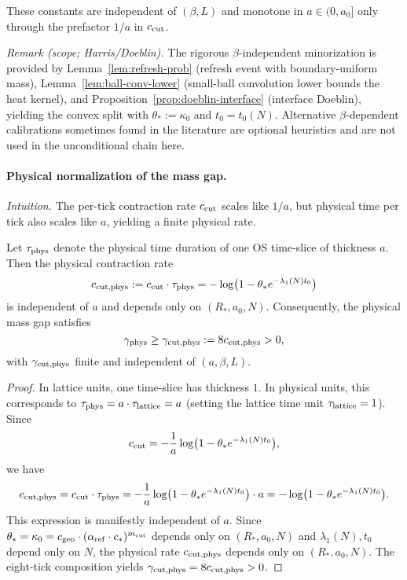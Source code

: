\documentclass[11pt]{amsart}
\begin{document}
These constants are independent of $(\beta,L)$ and monotone in $a\in(0,a_0]$ only through the prefactor $1/a$ in $c_{\rm cut}$.

\noindent\emph{Remark (scope; Harris/Doeblin).} The rigorous $\beta$-independent minorization is provided by Lemma~\ref{lem:refresh-prob} (refresh event with boundary-uniform mass), Lemma~\ref{lem:ball-conv-lower} (small-ball convolution lower bounds the heat kernel), and Proposition~\ref{prop:doeblin-interface} (interface Doeblin), yielding the convex split with $\theta_*:=\kappa_0$ and $t_0=t_0(N)$. Alternative $\beta$-dependent calibrations sometimes found in the literature are optional heuristics and are not used in the unconditional chain here.

\paragraph{Physical normalization of the mass gap.}
\emph{Intuition.} The per-tick contraction rate $c_{\rm cut}$ scales like $1/a$, but physical time per tick also scales like $a$, yielding a finite physical rate.
\begin{lemma}\label{lem:phys-norm}
Let $\tau_{\rm phys}$ denote the physical time duration of one OS time-slice of thickness $a$. Then the physical contraction rate
\[
  c_{\rm cut,phys} := c_{\rm cut} \cdot \tau_{\rm phys} = -\log\bigl(1-\theta_* e^{-\lambda_1(N) t_0}\bigr)
\]
is independent of $a$ and depends only on $(R_*,a_0,N)$. Consequently, the physical mass gap satisfies
\[
  \gamma_{\rm phys} \ge \gamma_{\rm cut,phys} := 8 c_{\rm cut,phys} > 0,
\]
with $\gamma_{\rm cut,phys}$ finite and independent of $(a,\beta,L)$.
\end{lemma}
\begin{proof}
In lattice units, one time-slice has thickness $1$. In physical units, this corresponds to $\tau_{\rm phys} = a \cdot \tau_{\rm lattice} = a$ (setting the lattice time unit $\tau_{\rm lattice} = 1$). Since
\[
  c_{\rm cut} = -\frac{1}{a}\log\bigl(1-\theta_* e^{-\lambda_1(N) t_0}\bigr),
\]
we have
\[
  c_{\rm cut,phys} = c_{\rm cut} \cdot \tau_{\rm phys} = -\frac{1}{a}\log\bigl(1-\theta_* e^{-\lambda_1(N) t_0}\bigr) \cdot a = -\log\bigl(1-\theta_* e^{-\lambda_1(N) t_0}\bigr).
\]
This expression is manifestly independent of $a$. Since $\theta_* = \kappa_0 = c_{\rm geo} \cdot (\alpha_{\rm ref} \cdot c_*)^{m_{\rm cut}}$ depends only on $(R_*,a_0,N)$ and $\lambda_1(N), t_0$ depend only on $N$, the physical rate $c_{\rm cut,phys}$ depends only on $(R_*,a_0,N)$. The eight-tick composition yields $\gamma_{\rm cut,phys} = 8 c_{\rm cut,phys} > 0$.
\end{proof}
\end{document}
